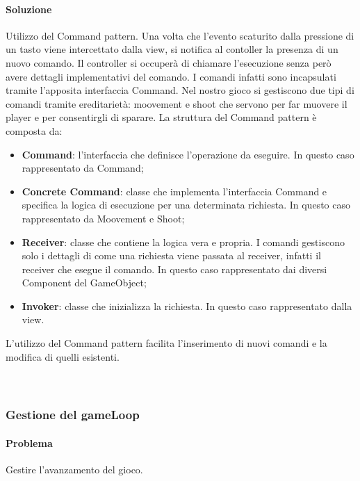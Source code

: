 \documentclass[a4paper,12pt]{report}
\begin{document}
\paragraph*{Soluzione} Utilizzo del Command pattern. Una volta che l’evento scaturito dalla pressione di un tasto viene intercettato dalla view, si notifica al contoller la presenza di un nuovo comando. Il controller si occuperà di chiamare l’esecuzione senza però avere dettagli implementativi del comando. I comandi infatti sono incapsulati tramite l’apposita interfaccia Command. Nel nostro gioco si gestiscono due tipi di comandi tramite ereditarietà: moovement e shoot che servono per far muovere il player e per consentirgli di sparare.
La struttura del Command pattern è composta da:
\begin{itemize}
	\item \textbf{Command}:
	l'interfaccia che definisce l’operazione da eseguire. In questo caso rappresentato da Command;
	\item \textbf{Concrete Command}:
	classe che implementa l’interfaccia Command e specifica la logica di esecuzione per una determinata richiesta. In questo caso rappresentato da Moovement e Shoot;
	\item \textbf{Receiver}:
	classe che contiene la logica vera e propria. I comandi gestiscono solo i dettagli di come una richiesta viene passata al receiver, infatti il receiver che esegue il comando. In questo caso rappresentato dai diversi Component del GameObject;
	\item \textbf{Invoker}:
	classe che inizializza la richiesta. In questo caso rappresentato dalla view.
\end{itemize}
L’utilizzo del Command pattern facilita l’inserimento di nuovi comandi e la modifica di quelli esistenti.
%
\\ \\ \\
\subsubsection*{Gestione del gameLoop}
%
\paragraph*{Problema} Gestire l'avanzamento del gioco.
%
\end{document}
